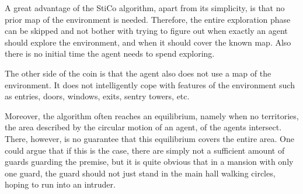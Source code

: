 A great advantage of the StiCo algorithm, apart from its simplicity, is that no prior map of the environment is needed. Therefore, the entire exploration phase can be skipped and not bother with trying to figure out when exactly an agent should explore the environment, and when it should cover the known map. Also there is no initial time the agent needs to spend exploring.

The other side of the coin is that the agent also does not use a map of the environment. It does not intelligently cope with features of the environment such as entries, doors, windows, exits, sentry towers, etc.

Moreover, the algorithm often reaches an equilibrium, namely when no territories, the area described by the circular motion of an agent, of the agents intersect. There, however, is no guarantee that this equilibrium covers the entire area. One could argue that if this is the case, there are simply not a sufficient amount of guards guarding the premise, but it is quite obvious that in a mansion with only one guard, the guard should not just stand in the main hall walking circles, hoping to run into an intruder.

